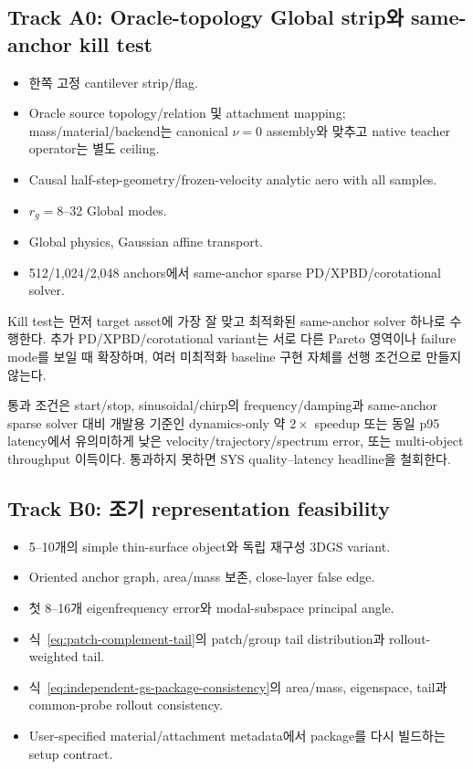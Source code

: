 \documentclass[11pt,a4paper]{article}
\begin{document}
\subsection{Track A0: Oracle-topology Global strip와 same-anchor kill test}

\begin{itemize}[leftmargin=1.5em]
  \item 한쪽 고정 cantilever strip/flag.
  \item Oracle source topology/relation 및 attachment mapping;
  mass/material/backend는 canonical \(\nu=0\) assembly와 맞추고 native teacher operator는 별도 ceiling.
  \item Causal half-step-geometry/frozen-velocity analytic aero with all samples.
  \item \(r_g=8\)--32 Global modes.
  \item Global physics, Gaussian affine transport.
  \item 512/1,024/2,048 anchors에서 same-anchor sparse PD/XPBD/corotational solver.
\end{itemize}

Kill test는 먼저 target asset에 가장 잘 맞고 최적화된 same-anchor solver 하나로 수행한다.
추가 PD/XPBD/corotational variant는 서로 다른 Pareto 영역이나 failure mode를 보일 때 확장하며,
여러 미최적화 baseline 구현 자체를 선행 조건으로 만들지 않는다.

통과 조건은 start/stop, sinusoidal/chirp의 frequency/damping과
same-anchor sparse solver 대비 개발용 기준인 dynamics-only 약 \(2\times\) speedup 또는
동일 p95 latency에서 유의미하게 낮은 velocity/trajectory/spectrum error,
또는 multi-object throughput 이득이다.
통과하지 못하면 SYS quality--latency headline을 철회한다.

\subsection{Track B0: 조기 representation feasibility}

\begin{itemize}[leftmargin=1.5em]
  \item 5--10개의 simple thin-surface object와 독립 재구성 3DGS variant.
  \item Oriented anchor graph, area/mass 보존, close-layer false edge.
  \item 첫 8--16개 eigenfrequency error와 modal-subspace principal angle.
  \item 식~\eqref{eq:patch-complement-tail}의 patch/group tail distribution과 rollout-weighted tail.
  \item 식~\eqref{eq:independent-gs-package-consistency}의
  area/mass, eigenspace, tail과 common-probe rollout consistency.
  \item User-specified material/attachment metadata에서 package를 다시 빌드하는 setup contract.
\end{itemize}
\end{document}
